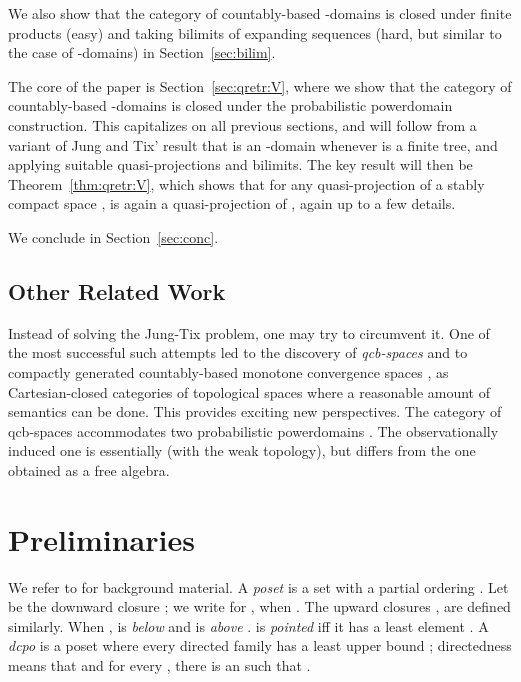 \documentclass{LMCS}
\begin{document}
We also show that the category of countably-based -domains is
closed under finite products (easy) and taking bilimits of expanding
sequences (hard, but similar to the case of -domains) in
Section~\ref{sec:bilim}.

The core of the paper is Section~\ref{sec:qretr:V}, where we show that
the category  of countably-based -domains is closed
under the probabilistic powerdomain construction.  This capitalizes on
all previous sections, and will follow from a variant of Jung and Tix'
result that  is an -domain whenever  is a finite
tree, and applying suitable quasi-projections and bilimits.
The key result will then be Theorem~\ref{thm:qretr:V}, which shows
that for any quasi-projection  of a stably compact space ,
 is again a quasi-projection of , again up to
a few details.


We conclude in Section~\ref{sec:conc}.

\subsection{Other Related Work}

Instead of solving the Jung-Tix problem, one may try to circumvent it.
One of the most successful such attempts led to the discovery of {\em
  qcb-spaces\/} \cite{BSS:qcb} and to compactly generated
countably-based monotone convergence spaces \cite{BSS:cgdom}, as
Cartesian-closed categories of topological spaces where a reasonable
amount of semantics can be done.  This provides exciting new
perspectives.  The category of qcb-spaces accommodates two
probabilistic powerdomains \cite{BS:twoval}.  The observationally
induced one is essentially  (with the weak topology), but
differs from the one obtained as a free algebra.


\section{Preliminaries}
\label{sec:prelim}

We refer to \cite{AJ:domains,GHKLMS:contlatt,Mislove:topo:CS} for
background material.
A {\em poset\/}  is a set with a partial ordering .  Let  be the downward closure ; we write  for , when .  The
upward closures ,  are defined similarly.  When ,  is {\em below\/}  and  is {\em above\/} .  
is {\em pointed\/} iff it has a least element .  A {\em dcpo\/}
is a poset  where every directed family  has a
least upper bound ; directedness means that  and for every , there is an  such
that .
\end{document}
